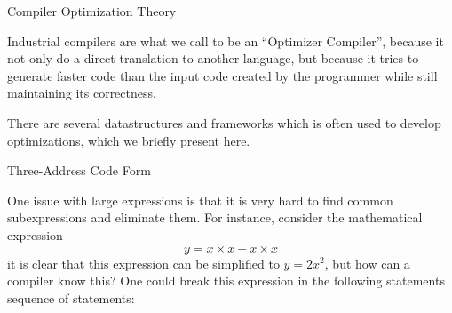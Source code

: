 \begin{section}{Compiler Optimization Theory}\label{sec:optimization}

Industrial compilers are what we call to be an ``Optimizer Compiler'', because
it not only do a direct translation to another language, but because it
tries to generate faster code than the input code created by the programmer
while still maintaining its correctness.

There are several datastructures and frameworks which is often used to
develop optimizations, which we briefly present here.

%
%
%
%
%
%

\begin{subsection}{Three-Address Code Form}

One issue with large expressions is that it is very hard to find common
subexpressions and eliminate them. For instance, consider the mathematical
expression
$$y = x \times x + x \times x $$
it is clear that this expression can be simplified to $y = 2x^2$, but how
can a compiler know this? One could break this expression in the following
statements sequence of statements:


\end{subsection}
\end{section}
